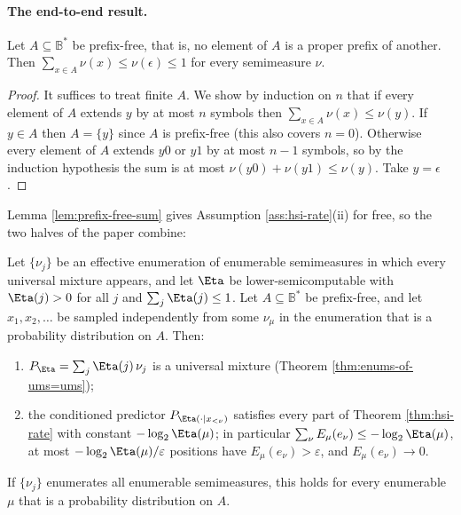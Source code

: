 \paragraph{The end-to-end result.}
\begin{lemma}
\label{lem:prefix-free-sum}
Let $A\subseteq\mathbb{B}^*$ be prefix-free, that is, no element of $A$ is a proper prefix of another. Then $\sum_{x\in A}\nu(x)\le\nu(\epsilon)\le 1$ for every semimeasure $\nu$.
\end{lemma}
\begin{proof}
It suffices to treat finite $A$. We show by induction on $n$ that if every element of $A$ extends $y$ by at most $n$ symbols then $\sum_{x\in A}\nu(x)\le\nu(y)$. If $y\in A$ then $A=\{y\}$ since $A$ is prefix-free (this also covers $n=0$). Otherwise every element of $A$ extends $y0$ or $y1$ by at most $n-1$ symbols, so by the induction hypothesis the sum is at most $\nu(y0)+\nu(y1)\le\nu(y)$. Take $y=\epsilon$.
\end{proof}
Lemma \ref{lem:prefix-free-sum} gives Assumption \ref{ass:hsi-rate}(ii) for free, so the two halves of the paper combine:

\begin{theorem}
\label{thm:hsi-end-to-end}
Let $\{\nu_j\}$ be an effective enumeration of enumerable semimeasures in which every universal mixture appears, and let $\Eta$ be lower-semicomputable with $\Eta(j)>0$ for all $j$ and $\sum_j\Eta(j)\le 1$. Let $A\subseteq\mathbb{B}^*$ be prefix-free, and let $x_1,x_2,\dots$ be sampled independently from some $\nu_\mu$ in the enumeration that is a probability distribution on $A$. Then:
\begin{enumerate}
    \item $P_\Eta=\sum_j\Eta(j)\,\nu_j$ is a universal mixture (Theorem \ref{thm:enums-of-ums=ums});
    \item the conditioned predictor $P_{\Eta(\cdot\mid x_{<\nu})}$ satisfies every part of Theorem \ref{thm:hsi-rate} with constant $-\log_2\Eta(\mu)$; in particular $\sum_{\nu}E_\mu(e_\nu)\le-\log_2\Eta(\mu)$, at most $-\log_2\Eta(\mu)/\varepsilon$ positions have $E_\mu(e_\nu)>\varepsilon$, and $E_\mu(e_\nu)\to 0$.
\end{enumerate}
If $\{\nu_j\}$ enumerates all enumerable semimeasures, this holds for every enumerable $\mu$ that is a probability distribution on $A$.
\end{theorem}

